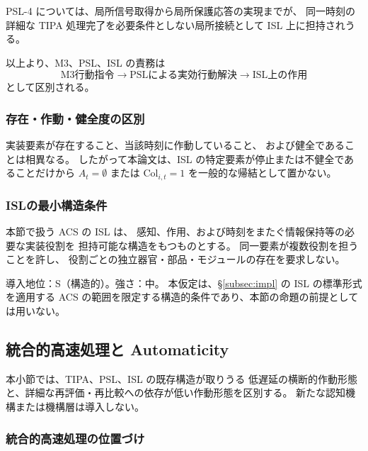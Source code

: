 PSL-4 については、局所信号取得から局所保護応答の実現までが、
同一時刻の詳細な TIPA 処理完了を必要条件としない局所接続として
ISL 上に担持されうる。

以上より、M3、PSL、ISL の責務は
\[
  \text{M3行動指令}
  \longrightarrow
  \text{PSLによる実効行動解決}
  \longrightarrow
  \text{ISL上の作用}
\]
として区別される。

\subsubsection{存在・作動・健全度の区別}
\label{subsubsec:impl_state_distinction}

\begin{remark}
\label{rem:impl_exist_activity}
実装要素が存在すること、当該時刻に作動していること、
および健全であることは相異なる。
したがって本論文は、ISL の特定要素が停止または不健全であることだけから
$A_t=\emptyset$ または $\mathrm{Col}_{i,t}=1$ を一般的な帰結として置かない。
\end{remark}

\subsubsection{ISLの最小構造条件}
\label{subsubsec:impl_minimal_conditions}

\begin{assumption}[実装部位層の構造的仮定]
\label{ass:impl_structure}
本節で扱う ACS の ISL は、
感知、作用、および時刻をまたぐ情報保持等の必要な実装役割を
担持可能な構造をもつものとする。
同一要素が複数役割を担うことを許し、
役割ごとの独立器官・部品・モジュールの存在を要求しない。

導入地位：S（構造的）。強さ：中。
本仮定は、\S\ref{subsec:impl} の ISL の標準形式を適用する ACS の範囲を限定する構造的条件であり、本節の命題の前提としては用いない。
\end{assumption}

\subsection{統合的高速処理と Automaticity}
\label{subsec:fast_processing}

本小節では、TIPA、PSL、ISL の既存構造が取りうる
低遅延の横断的作動形態と、詳細な再評価・再比較への依存が低い作動形態を区別する。
新たな認知機構または機構層は導入しない。

\subsubsection{統合的高速処理の位置づけ}
\label{subsubsec:fast_position}

